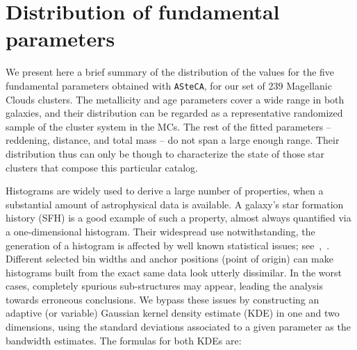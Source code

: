 \documentclass{aa}
\begin{document}

\section{Distribution of fundamental parameters}
\label{sec:param-dist}

We present here a brief summary of the distribution of the values for the five
fundamental parameters obtained with \texttt{ASteCA}, for our set of 239
Magellanic Clouds clusters. The metallicity and age parameters cover a wide
range in both galaxies, and their distribution can be regarded as a
representative randomized sample of the cluster system in the MCs.
%
The rest of the fitted parameters -- reddening, distance, and total mass -- do
not span a large enough range. Their distribution thus can only be
though to characterize the state of those star clusters that compose this
particular catalog.

%


Histograms are widely used to derive a large number of properties, when a
substantial amount of astrophysical data is available. A galaxy's star
formation history (SFH) is a good example of such a property, almost always
quantified via a one-dimensional histogram.
%
Their widespread use notwithstanding, the generation of a histogram is affected
by well known statistical issues;
see~\cite{Silverman_1986},~\cite{Simonoff_1997}. Different selected bin widths
and anchor positions (point of origin) can make histograms built
from the exact same data look utterly dissimilar. In the worst cases, completely
spurious sub-structures may appear, leading the analysis towards erroneous
conclusions.
%
We bypass these issues by constructing an adaptive (or variable) Gaussian kernel
density estimate (KDE) in one and two dimensions, using the standard deviations
associated to a given parameter as the bandwidth estimates. The formulas for
both KDEs are:
\end{document}
